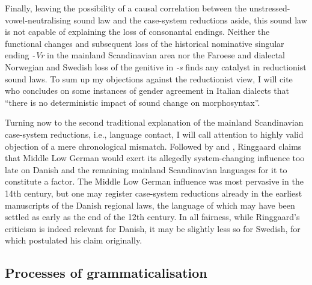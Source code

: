 \documentclass[output=paper]{langsci/langscibook}
\begin{document}
Finally, leaving the possibility of a causal correlation between the unstressed-vowel-neu\-tral\-ising sound law and the case-system reductions aside, this sound law is not capable of explaining the loss of consonantal endings. Neither the functional changes and subsequent loss of the historical nominative singular ending \textit{{}-Vr} in the mainland Scandinavian area \citep[18]{Jensen2011} nor the Faroese and dialectal Norwegian and Swedish loss of the genitive in \textit{{}-s} \citep[6--7]{Enger2013} finds any catalyst in reductionist sound laws. To sum up my objections against the reductionist view, I will cite \citet[42]{Loporcaro2018} who concludes on some instances of gender agreement in Italian dialects that “there is no deterministic impact of sound change on morphosyntax”.

Turning now to the second traditional explanation of the mainland Scandinavian case-system reductions, i.e., language contact, I will call attention to  highly valid objection of a mere chronological mismatch. Followed by \citet[2--3]{Askedal2005} and \citet[13--14]{Enger2013}, Ringgaard claims that Middle Low German would exert its allegedly system-changing influence too late on Danish and the remaining mainland Scandinavian languages for it to constitute a factor. The Middle Low German influence was most pervasive in the 14th century, but one may register case-system reductions already in the earliest manuscripts of the Danish regional laws, the language of which may have been settled as early as the end of the 12th century. In all fairness, while Ringgaard’s criticism is indeed relevant for Danish, it may be slightly less so for Swedish, for which \citet[27]{Wessén1954} postulated his claim originally.

\subsection{Processes of grammaticalisation} \label{hansen:3.3}
\end{document}
